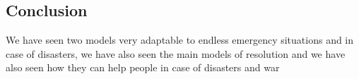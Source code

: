 \subsection{Conclusion}

We have seen two models very adaptable to endless emergency situations and in case of disasters, we have also seen the main models of resolution and we have also seen how they can help people in case of disasters and war
